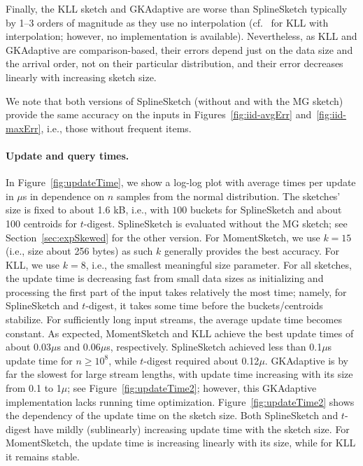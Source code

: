 \documentclass[acmsmall]{acmart}
\theoremstyle{remark}
\begin{document}
Finally, the KLL sketch and GKAdaptive are worse than SplineSketch typically by 1--3 orders of magnitude 
as they use no interpolation (cf.~\cite{SchieferCINSW23-KLLinterpolation} for KLL with interpolation; however, no implementation is available).
Nevertheless, as KLL and GKAdaptive are comparison-based, their errors depend just on the data size and the arrival order,
not on their particular distribution, and their error decreases linearly with increasing sketch size.

We note that both versions of SplineSketch (without and with the MG sketch) provide the same accuracy on the inputs in Figures~\ref{fig:iid-avgErr} and~\ref{fig:iid-maxErr}, i.e., those without frequent items.

\paragraph{Update and query times.} %
In Figure~\ref{fig:updateTime}, we show a log-log plot with average times per update in $\mu$s
in dependence on $n$ samples from the normal distribution. The sketches' size is fixed to about 1.6 kB,
i.e., with $100$ buckets for SplineSketch and about 100 centroids for $t$-digest.
SplineSketch is evaluated without the MG sketch; see Section~\ref{sec:expSkewed} for the other version.
For MomentSketch, we use $k=15$ (i.e., size about 256 bytes) as such $k$ generally provides the best accuracy.
For KLL, we use $k=8$, i.e., the smallest meaningful size parameter.
For all sketches, the update time is decreasing fast from small data sizes
as initializing and processing the first part of the input takes relatively the most time;
namely, for SplineSketch and $t$-digest, it takes some time before the buckets/centroids stabilize.
For sufficiently long input streams, the average update time becomes constant.
As expected, MomentSketch and KLL achieve the best update times of about 0.03$\mu$s and 0.06$\mu$s, respectively.
SplineSketch achieved less than 0.1$\mu$s update time for $n\ge 10^8$,
while $t$-digest required about 0.12$\mu$.
GKAdaptive is by far the slowest for large stream lengths, with update time increasing with its size from 0.1 to 1$\mu$; see Figure~\ref{fig:updateTime2};
	however, this GKAdaptive implementation lacks running time optimization.
Figure~\ref{fig:updateTime2} shows the dependency of the update time on the sketch size.
Both SplineSketch and $t$-digest have mildly (sublinearly) increasing update time with the sketch size.
For MomentSketch, the update time is increasing linearly with its size,
while for KLL it remains stable.
\end{document}
